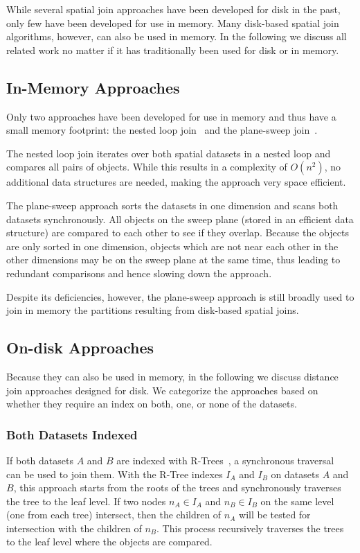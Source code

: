 \documentclass{vldb}
\begin{document}

While several spatial join approaches have been developed for disk in the past, only few have been developed for use in memory. Many disk-based spatial join
algorithms, however, can also be used in memory. In the following we discuss all related work no matter if it has traditionally been used for disk or in memory.
\vspace{-1mm}
\subsection{In-Memory Approaches}
Only two approaches have been developed for use in memory and thus have a small memory footprint: the nested loop join~\cite{joinprocessing} and the plane-sweep
join~\cite{computationalgeometry}.


The nested loop join iterates over both spatial datasets in a nested loop and compares all pairs of objects. While this results in a complexity of
$O(n^2)$, no additional data structures are needed, making the approach very space efficient.


The plane-sweep approach sorts the datasets in one dimension and scans both datasets synchronously. All objects on the sweep plane (stored in an efficient data
structure) are compared to each other to see if they overlap. Because the objects are only sorted in one dimension, objects which are not near each other in the
other dimensions may be on the sweep plane at the same time, thus leading to redundant comparisons and hence slowing down the approach.


Despite its deficiencies, however, the plane-sweep approach is still broadly used to join in memory the partitions resulting from disk-based spatial joins.

\vspace{-2mm}
\subsection{On-disk Approaches}
Because they can also be used in memory, in the following we discuss distance join approaches designed for disk. We categorize the approaches based on whether
they require an index on both, one, or none of the datasets.

\vspace{-2mm}
\subsubsection{Both Datasets Indexed}
\label{both}
If both datasets $A$ and $B$ are indexed with R-Trees~\cite{rtree}, a synchronous traversal~\cite{join:RTree} can be used to join them. With the R-Tree indexes
$I_A$ and $I_B$ on datasets $A$ and $B$, this approach starts from the roots of the trees and synchronously traverses the tree to the leaf level. If two nodes
$n_A \in I_A$ and $n_B \in I_B$ on the same level (one from each tree) intersect, then the children of $n_A$ will be tested for intersection with the children
of $n_B$. This process recursively traverses the trees to the leaf level where the objects are compared.
\end{document}
